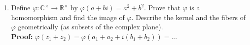 \documentclass{article}
\begin{document}
\begin{enumerate}
    \item Define $\varphi : \mathbb{C}^\times \rightarrow \mathbb{R}^\times$ by $\varphi (a+bi) = a^2 + b^2$. Prove that $\varphi$ is a homomorphism and find the image of $\varphi$. Describe the kernel and the fibers of $\varphi $ geometrically (as subsets of the complex plane). \\ \textbf{Proof:} $\varphi (z_1 + z_2) = \varphi (a_1 + a_2 + i(b_1 + b_2)) = ...$
\end{enumerate}
\end{document}
